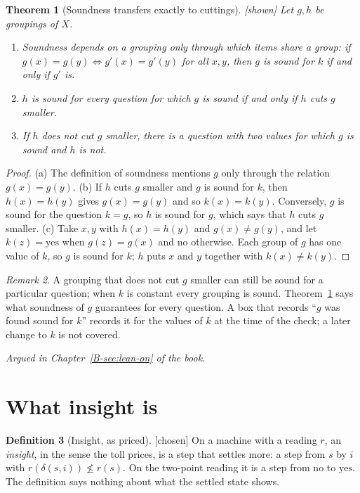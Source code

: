 \documentclass[11pt, a4paper]{article}
\theoremstyle{plain}
\newtheorem{theorem}{Theorem}[section]
\theoremstyle{definition}
\newtheorem{definition}[theorem]{Definition}
\theoremstyle{remark}
\newtheorem{remark}[theorem]{Remark}
\newcommand{\step}{\delta}
\newcommand{\rd}{r}
\newcommand{\argued}[1]{\par\noindent\textit{Argued in Chapter~\ref{B-#1} of the book.}\par}
\newcommand{\kind}[1]{\textup{[#1]}}
\begin{document}
\begin{theorem}[Soundness transfers exactly to cuttings]\label{spec:grouping} \kind{shown}
Let $g,h$ be groupings of $X$.
\begin{enumerate}[label=(\alph*)]
\item Soundness depends on a grouping only through which items share a group: if
$g(x)=g(y)\Leftrightarrow g'(x)=g'(y)$ for all $x,y$, then $g$ is sound for $k$ if and only if $g'$ is.
\item $h$ is sound for every question for which $g$ is sound if and only if $h$ cuts $g$ smaller.
\item If $h$ does not cut $g$ smaller, there is a question with two values for which $g$ is sound and $h$
is not.
\end{enumerate}
\end{theorem}

\begin{proof}
(a) The definition of soundness mentions $g$ only through the relation $g(x)=g(y)$.
(b) If $h$ cuts $g$ smaller and $g$ is sound for $k$, then $h(x)=h(y)$ gives $g(x)=g(y)$ and so
$k(x)=k(y)$. Conversely, $g$ is sound for the question $k=g$, so $h$ is sound for $g$, which says that $h$
cuts $g$ smaller.
(c) Take $x,y$ with $h(x)=h(y)$ and $g(x)\ne g(y)$, and let $k(z)=\mathrm{yes}$ when $g(z)=g(x)$ and
$\mathrm{no}$ otherwise. Each group of $g$ has one value of $k$, so $g$ is sound for $k$; $h$ puts $x$
and $y$ together with $k(x)\ne k(y)$.
\end{proof}

\begin{remark}
A grouping that does not cut $g$ smaller can still be sound for a particular question; when $k$ is
constant every grouping is sound. Theorem~\ref{spec:grouping} says what soundness of $g$ guarantees for
every question. A box that records ``$g$ was found sound for $k$'' records it for the values of $k$ at the
time of the check; a later change to $k$ is not covered.
\end{remark}

\argued{sec:lean-on}

\section{What insight is}\label{spec:ch13}

\begin{definition}[Insight, as priced]\label{spec:insight} \kind{chosen}
On a machine with a reading $\rd$, an \emph{insight}, in the sense the toll prices, is a step that settles
more: a step from $s$ by $i$ with $\rd(\step(s,i))\not\le\rd(s)$. On the two-point reading it is a step
from $\mathrm{no}$ to $\mathrm{yes}$. The definition says nothing about what the settled state shows.
\end{definition}
\end{document}
